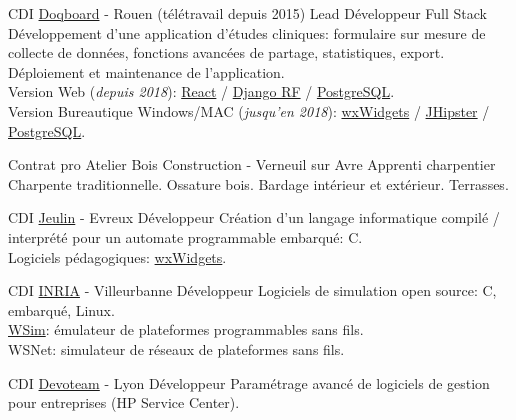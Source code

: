 \documentclass[10pt]{article} %
\begin{document}
\begin{paracol}{2}
  {CDI} %
  {\href{https://doqboard.com}{Doqboard} {\small- Rouen (télétravail depuis 2015)}} %
  {Lead Développeur Full Stack} %
  {Développement d'une application d'études cliniques: formulaire sur mesure de collecte de données, fonctions avancées de partage, statistiques, export.  Déploiement et maintenance de l'application.\\
    Version Web {\small(\textit{depuis 2018})}: \href{https://reactjs.org/}{React} / \href{https://www.django-rest-framework.org/}{Django RF} / \href{https://www.postgresql.org/}{PostgreSQL}. \\
    Version Bureautique Windows/MAC {\small(\textit{jusqu'en 2018})}: \href{https://www.wxwidgets.org/}{wxWidgets} / \href{https://www.jhipster.tech/}{JHipster} / \href{https://www.postgresql.org/}{PostgreSQL}.} %


  {Contrat pro} %
  {Atelier Bois Construction {\small- Verneuil sur Avre}} %
  {Apprenti charpentier} %
  {Charpente traditionnelle. Ossature bois. Bardage intérieur et extérieur. Terrasses.}  %


  {CDI} %
  {\href{https://www.jeulin.fr/}{Jeulin} {\small- Evreux}} %
  {Développeur} %
  {Création d'un langage informatique compilé / interprété pour un automate programmable embarqué: C. \\
    Logiciels pédagogiques: \href{https://www.wxwidgets.org/}{wxWidgets}.} %

  {CDI} %
  {\href{https://www.inria.fr/}{INRIA} {\small- Villeurbanne}} %
  {Développeur} %
  {Logiciels de simulation open source: C, embarqué, Linux. \\
    \href{https://github.com/afrab/WSim}{WSim}: émulateur de plateformes programmables sans fils. \\
    WSNet: simulateur de réseaux de plateformes sans fils.} %

  {CDI} %
  {\href{https://devoteam.com/}{Devoteam} {\small- Lyon}} %
  {Développeur} %
  {Paramétrage avancé de logiciels de gestion pour entreprises (HP Service Center).} %


\end{paracol}
\end{document}
